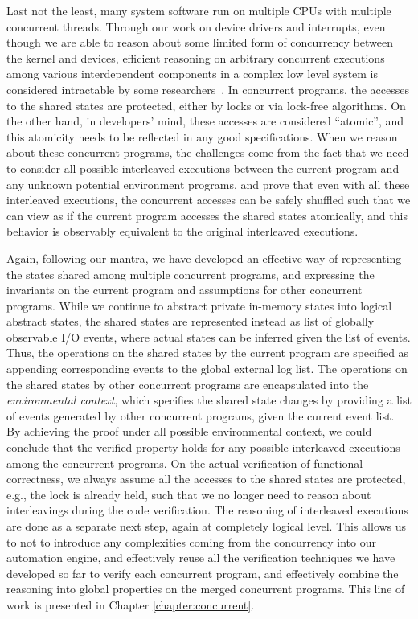 Last not the least, many system software run on multiple CPUs with
multiple concurrent threads.   
Through our work on device drivers and interrupts, even though
we are able to reason about some limited form of concurrency between the kernel and
devices, efficient reasoning on arbitrary concurrent executions among various
interdependent components in a complex low level system is considered
intractable by some researchers~\cite{vontessin13,peters15}. 
In concurrent programs, the accesses to the shared states are protected, either by
locks or via lock-free algorithms. On the other hand, in developers' mind, these accesses
are considered ``atomic'', and this atomicity needs to be reflected in any good specifications.
When we reason about these concurrent programs, the challenges come from the fact
that we need to consider all possible interleaved executions between the current program
and any unknown potential environment programs, and prove that even with all these interleaved
executions, the concurrent accesses can be safely shuffled such that we can view as if
the current program accesses the shared states atomically, and this behavior is observably
equivalent to the original interleaved executions.

Again, following our mantra, we have developed an effective way of representing the states
shared among multiple concurrent programs, and expressing the invariants on the current program
and assumptions for other concurrent programs. While we continue to abstract private in-memory
states into logical abstract states, the shared states are represented instead as list of globally
observable I/O events, where actual states can be inferred given the list of events. Thus, the operations
on the shared states by the current program are specified as appending corresponding events to the
global external log list. The operations on the shared states by other concurrent programs are encapsulated
into the {\it environmental context}, which specifies the shared state changes by providing a list of events
generated by other concurrent programs, given the current event list.
By achieving the proof under all possible environmental context, we could conclude that
the verified property holds for any possible interleaved executions among the concurrent programs.
On the actual verification of functional correctness, we always assume all the accesses to the shared
states are protected, e.g., the lock is already held, such that we no longer need to reason about interleavings
during the code verification. The reasoning of interleaved executions are done as a separate next step,
again at completely logical level.
This allows us to not to introduce any complexities coming from the concurrency into our automation engine,
and effectively reuse all the
verification techniques we have developed so far to verify each concurrent program, and effectively
combine the reasoning into global properties on the merged concurrent programs.
This line of work is presented in Chapter \ref{chapter:concurrent}.

